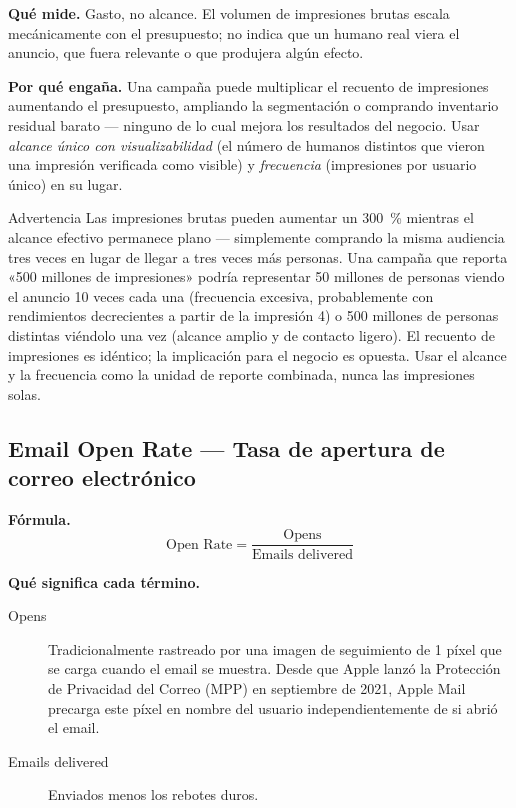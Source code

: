 \textbf{Qué mide.} Gasto, no alcance. El volumen de impresiones brutas escala mecánicamente
con el presupuesto; no indica que un humano real viera el anuncio, que fuera relevante o que
produjera algún efecto.

\textbf{Por qué engaña.} Una campaña puede multiplicar el recuento de impresiones aumentando
el presupuesto, ampliando la segmentación o comprando inventario residual barato --- ninguno
de lo cual mejora los resultados del negocio. Usar \emph{alcance único con visualizabilidad}
(el número de humanos distintos que vieron una impresión verificada como visible) y
\emph{frecuencia} (impresiones por usuario único) en su lugar.

\begin{admonition}{Advertencia}
Las impresiones brutas pueden aumentar un \qty{300}{\percent} mientras el alcance efectivo
permanece plano --- simplemente comprando la misma audiencia tres veces en lugar de llegar
a tres veces más personas. Una campaña que reporta «500 millones de impresiones» podría
representar 50 millones de personas viendo el anuncio 10 veces cada una (frecuencia excesiva,
probablemente con rendimientos decrecientes a partir de la impresión 4) o 500 millones de
personas distintas viéndolo una vez (alcance amplio y de contacto ligero). El recuento de
impresiones es idéntico; la implicación para el negocio es opuesta.
Usar el alcance y la frecuencia como la unidad de reporte combinada, nunca las impresiones
solas.
\end{admonition}


\subsection{Email Open Rate --- Tasa de apertura de correo electrónico}

\textbf{Fórmula.}
\[
  \text{Open Rate} = \frac{\text{Opens}}{\text{Emails delivered}}
\]

\textbf{Qué significa cada término.}
\begin{description}
  \item[Opens] Tradicionalmente rastreado por una imagen de seguimiento de 1 píxel que se
    carga cuando el email se muestra. Desde que Apple lanzó la Protección de Privacidad del
    Correo (MPP) en septiembre de 2021, Apple Mail precarga este píxel en nombre del usuario
    independientemente de si abrió el email.
  \item[Emails delivered] Enviados menos los rebotes duros.
\end{description}

